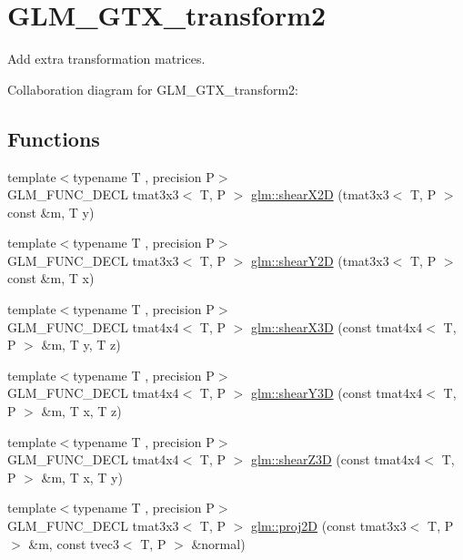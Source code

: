 \hypertarget{group__gtx__transform2}{\section{G\-L\-M\-\_\-\-G\-T\-X\-\_\-transform2}
\label{group__gtx__transform2}
}


Add extra transformation matrices.  


Collaboration diagram for G\-L\-M\-\_\-\-G\-T\-X\-\_\-transform2\-:
\subsection*{Functions}
\begin{DoxyCompactItemize}
\item 
{\footnotesize template$<$typename T , precision P$>$ }\\G\-L\-M\-\_\-\-F\-U\-N\-C\-\_\-\-D\-E\-C\-L tmat3x3$<$ T, P $>$ \hyperlink{group__gtx__transform2_ga10f6c62d8f827c4cacedb71fd05e4ba2}{glm\-::shear\-X2\-D} (tmat3x3$<$ T, P $>$ const \&m, T y)
\item 
{\footnotesize template$<$typename T , precision P$>$ }\\G\-L\-M\-\_\-\-F\-U\-N\-C\-\_\-\-D\-E\-C\-L tmat3x3$<$ T, P $>$ \hyperlink{group__gtx__transform2_ga21ade82859e09a5cdaf4a01fbf8dc61b}{glm\-::shear\-Y2\-D} (tmat3x3$<$ T, P $>$ const \&m, T x)
\item 
{\footnotesize template$<$typename T , precision P$>$ }\\G\-L\-M\-\_\-\-F\-U\-N\-C\-\_\-\-D\-E\-C\-L tmat4x4$<$ T, P $>$ \hyperlink{group__gtx__transform2_gae06ce274e4754f925d5d68440e89452e}{glm\-::shear\-X3\-D} (const tmat4x4$<$ T, P $>$ \&m, T y, T z)
\item 
{\footnotesize template$<$typename T , precision P$>$ }\\G\-L\-M\-\_\-\-F\-U\-N\-C\-\_\-\-D\-E\-C\-L tmat4x4$<$ T, P $>$ \hyperlink{group__gtx__transform2_ga31253ea18fdcdfde08c134c8b67688f7}{glm\-::shear\-Y3\-D} (const tmat4x4$<$ T, P $>$ \&m, T x, T z)
\item 
{\footnotesize template$<$typename T , precision P$>$ }\\G\-L\-M\-\_\-\-F\-U\-N\-C\-\_\-\-D\-E\-C\-L tmat4x4$<$ T, P $>$ \hyperlink{group__gtx__transform2_ga5558ac64a7144685bf2eb4483a0e2f51}{glm\-::shear\-Z3\-D} (const tmat4x4$<$ T, P $>$ \&m, T x, T y)
\item 
{\footnotesize template$<$typename T , precision P$>$ }\\G\-L\-M\-\_\-\-F\-U\-N\-C\-\_\-\-D\-E\-C\-L tmat3x3$<$ T, P $>$ \hyperlink{group__gtx__transform2_gacfce1085167a8bfb71a55ea14d22752f}{glm\-::proj2\-D} (const tmat3x3$<$ T, P $>$ \&m, const tvec3$<$ T, P $>$ \&normal)

\end{DoxyCompactItemize}
